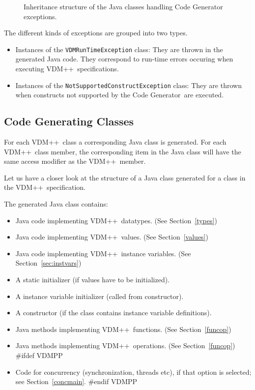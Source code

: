 \documentclass[\pformat,11pt]{article}
\newcommand{\tcg}{the Code Generator}
\newcommand{\VDM}{VDM++}
\begin{document}
\begin{itemize}
\begin{figure}[tbh]
\begin{center}
\begin{picture}
\end{picture}
\caption{Inheritance structure of the Java classes handling Code Generator exceptions.\label{fig:exceptionclasses}}
\end{center}
\end{figure}

The different kinds of exceptions are grouped into two types.
\begin{itemize}

\item Instances of the {\tt VDMRunTimeException} class: They are
thrown in the generated Java code. They correspond to run-time errors
occuring when executing \VDM\ specifications.  

\item Instances of the {\tt NotSupportedConstructException} class:
They are thrown when constructs not supported by \tcg\ are executed.  

\end{itemize}
\end{itemize}

\subsection{Code Generating Classes}
\label{sec:classes}

For each \VDM\ class a corresponding Java class is generated. For each
\VDM\ class member, the corresponding item in the  Java class will
have the same access modifier as the \VDM\ member.

Let us have a closer look at the structure of a Java class generated
for a class in the \VDM\ specification. 

The generated Java class contains:

\begin{itemize}
\item Java code implementing \VDM\ datatypes. (See Section~\ref{types})
\item Java code implementing \VDM\ values. (See Section~\ref{values})
\item Java code implementing \VDM\ instance variables. (See Section~\ref{sec:instvars})
\item A static initializer (if values have to be initialized).
\item A instance variable initializer (called from constructor).
\item A constructor (if the class contains instance variable definitions).
\item Java methods implementing \VDM\ functions. (See Section~\ref{funcop})
\item Java methods implementing \VDM\ operations. (See Section~\ref{funcop})
#ifdef VDMPP
\item Code for concurrency (synchronization, threads etc), if that
option is selected; see Section~\ref{concmain}.
#endif VDMPP
\end{itemize}
\end{document}
